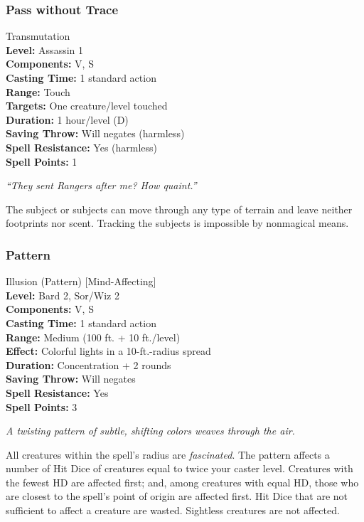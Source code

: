 \subsubsection{Pass without Trace}
\label{Spell:PassWithoutTrace}
Transmutation
\\ \textbf{Level:} Assassin 1
\\ \textbf{Components:} V, S
\\ \textbf{Casting Time:} 1 standard action
\\ \textbf{Range:} Touch
\\ \textbf{Targets:} One creature/level touched
\\ \textbf{Duration:} 1 hour/level (D)
\\ \textbf{Saving Throw:} Will negates (harmless)
\\ \textbf{Spell Resistance:} Yes (harmless)
\\ \textbf{Spell Points:} 1

\emph{``They sent Rangers after me? How quaint.''}

The subject or subjects can move through any type of terrain and leave neither footprints nor scent. 
Tracking the subjects is impossible by nonmagical means.
\subsubsection{Pattern} 
\label{Spell:Pattern}
Illusion (Pattern) [Mind-Affecting]
\\ \textbf{Level:} Bard 2, Sor/Wiz 2
\\ \textbf{Components:} V, S
\\ \textbf{Casting Time:} 1 standard action
\\ \textbf{Range:} Medium (100 ft. + 10 ft./level)
\\ \textbf{Effect:} Colorful lights in a 10-ft.-radius spread
\\ \textbf{Duration:} Concentration + 2 rounds
\\ \textbf{Saving Throw:} Will negates
\\ \textbf{Spell Resistance:} Yes
\\ \textbf{Spell Points:} 3

\emph{A twisting pattern of subtle, shifting colors weaves through the air.}

All creatures within the spell's radius are \emph{fascinated}. 
The pattern affects a number of Hit Dice of creatures equal to twice your caster level. 
Creatures with the fewest HD are affected first; and, among creatures with equal HD, those who are closest to the spell's point of origin are affected first. 
Hit Dice that are not sufficient to affect a creature are wasted. 
Sightless creatures are not affected.

